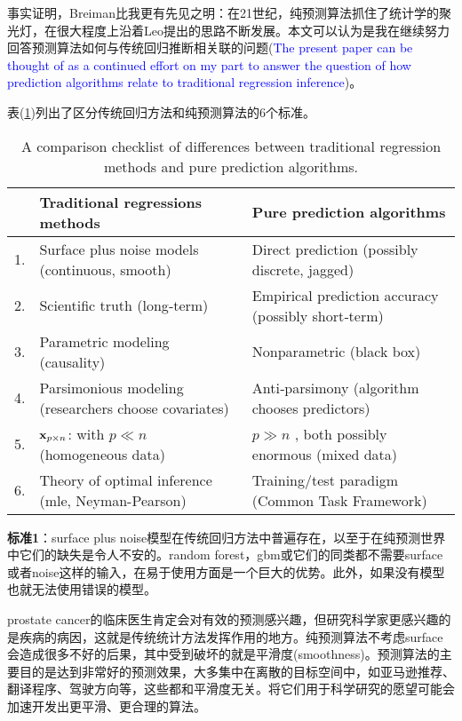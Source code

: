 \documentclass[lang=cn,11pt,a4paper,cite=authoryear]{elegantpaper}
\begin{document}
事实证明，Breiman比我更有先见之明：在21世纪，纯预测算法抓住了统计学的聚光灯，在很大程度上沿着Leo提出的思路不断发展。本文可以认为是我在继续努力回答预测算法如何与传统回归推断相关联的问题(\textcolor{blue}{The present paper can be thought of as a continued effort on my part to answer the question of how prediction algorithms relate to traditional regression inference})。

表(\ref{table5})列出了区分传统回归方法和纯预测算法的6个标准。

\begin{table}[H]
    \centering
    \caption{A comparison checklist of differences between traditional regression methods and pure prediction algorithms.}
    \label{table5}
    \begin{tabular}{lll}
    \toprule
        &Traditional regressions methods &  Pure prediction algorithms \\
    \midrule
        1. & Surface plus noise models (continuous, smooth) & Direct prediction (possibly discrete, jagged) \\
        2. & Scientific truth (long‐term) & Empirical prediction accuracy (possibly short‐term) \\ 
        3. & Parametric modeling (causality) & Nonparametric (black box) \\
        4. & Parsimonious modeling (researchers choose covariates) & Anti‐parsimony (algorithm chooses predictors) \\ 
        5. & $\bold{x}_{p\times n}$: with $p \ll n$  (homogeneous data) &  $p \gg n$ , both possibly enormous (mixed data) \\ 
        6. & Theory of optimal inference (mle, Neyman-Pearson) & Training/test paradigm (Common Task Framework) \\ 
    \bottomrule
    \end{tabular}
\end{table}

\textbf{标准1}：surface plus noise模型在传统回归方法中普遍存在，以至于在纯预测世界中它们的缺失是令人不安的。random forest，gbm或它们的同类都不需要surface或者noise这样的输入，在易于使用方面是一个巨大的优势。此外，如果没有模型也就无法使用错误的模型。

prostate cancer的临床医生肯定会对有效的预测感兴趣，但研究科学家更感兴趣的是疾病的病因，这就是传统统计方法发挥作用的地方。纯预测算法不考虑surface会造成很多不好的后果，其中受到破坏的就是平滑度(smoothness)。预测算法的主要目的是达到非常好的预测效果，大多集中在离散的目标空间中，如亚马逊推荐、翻译程序、驾驶方向等，这些都和平滑度无关。将它们用于科学研究的愿望可能会加速开发出更平滑、更合理的算法。
\end{document}
